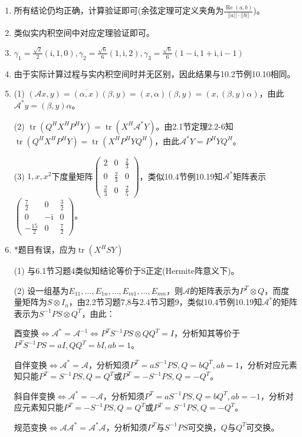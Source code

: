 \documentclass[a4paper,UTF8,fontset=windows]{ctexart}
\DeclareMathOperator{\re}{Re}
\DeclareMathOperator{\tr}{tr}
\begin{document}
\begin{enumerate}
\item
所有结论仍均正确，计算验证即可(余弦定理可定义夹角为$\frac{\re(a,b)}{||a||\cdot||b||}$)。

\item
类似实内积空间中对应定理验证即可。

\item
$\gamma_1=\frac{\sqrt2}{2}(\mathrm{i},1,0),\gamma_2=\frac{\sqrt6}{6}(1,\mathrm{i},2),\gamma_3=\frac{\sqrt6}{6}(1-\mathrm{i},1+\mathrm{i},\mathrm{i}-1)$


\item
由于实际计算过程与实内积空间时并无区别，因此结果与10.2节例10.10相同。

\item
(1) $(\mathcal{A}x,y)=\overline{(\alpha,x)}(\beta,y)=(x,\alpha)(\beta,y)=(x,(\beta,y)\alpha)$，由此$\mathcal{A}^*y=(\beta,y)\alpha$。

(2) $\tr(Q^HX^HP^HY)=\tr(X^H\mathcal{A}^*Y)$。由2.1节定理2.2-6知$\tr(Q^HX^HP^HY)=\tr(X^HP^HYQ^H)$，由此$\mathcal{A}^*Y=P^HYQ^H$。

(3) $1,x,x^2$下度量矩阵$\begin{pmatrix}2&0&\frac{2}{3}\\[2ex]0&\frac{2}{3}&0\\[2ex]\frac{2}{3}&0&\frac{2}{5}\end{pmatrix}$，类似10.4节例10.19知$\mathcal{A}^*$矩阵表示$\begin{pmatrix}\frac{7}{2}&0&\frac{3}{2}\\0&-\mathrm{i}&0\\-\frac{15}{2}&0&\frac{7}{2}\end{pmatrix}$。

\item
*题目有误，应为$\tr(X^HSY)$

(1) 与6.1节习题4类似知结论等价于S正定(Hermite阵意义下)。

(2) 设一组基为$E_{11},\dots,E_{1n},\dots,E_{m1},\dots,E_{mn}$，则$\mathcal{A}$的矩阵表示为$P^T\otimes Q$，而度量矩阵为$S\otimes I_n$，由2.2节习题7,8与2.4节习题9，类似10.4节例10.19知$\mathcal{A}^*$的矩阵表示为$S^{-1}PS\otimes Q^T$，由此：

酉变换$\Leftrightarrow\mathcal{A}^*=\mathcal{A}^{-1}\Leftrightarrow P^TS^{-1}PS\otimes QQ^T=I$，分析知其等价于$P^TS^{-1}PS=aI,QQ^T=bI,ab=1$。

自伴变换$\Leftrightarrow\mathcal{A}^*=\mathcal{A}$，分析知须$P^T=aS^{-1}PS,Q=bQ^T,ab=1$，分析对应元素知只能$P^T=S^{-1}PS,Q=Q^T$或$P^T=-S^{-1}PS,Q=-Q^T$。

斜自伴变换$\Leftrightarrow\mathcal{A}^*=-\mathcal{A}$，分析知须$P^T=aS^{-1}PS,Q=bQ^T,ab=-1$，分析对应元素知只能$P^T=-S^{-1}PS,Q=Q^T$或$P^T=S^{-1}PS,Q=-Q^T$。

规范变换$\Leftrightarrow\mathcal{A}\mathcal{A}^*=\mathcal{A}^*\mathcal{A}$，分析知须$P^T$与$S^{-1}PS$可交换，$Q$与$Q^T$可交换。
\end{enumerate}
\end{document}
